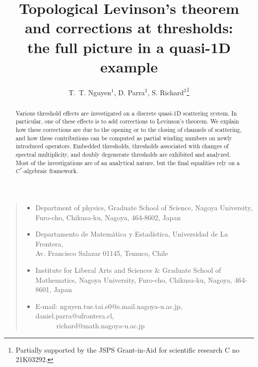 \documentclass[11pt]{article}
\begin{document}

\title{Topological Levinson's theorem and corrections at thresholds: \\
the full picture in a quasi-1D example}

\author{T.~T. Nguyen${}^1$, D. Parra${}^2$, S. Richard${}^3$\footnote{Partially supported by the JSPS Grant-in-Aid for scientific research C no 21K03292.}}

\date{\small}
\maketitle
\vspace{-1cm}

\begin{quote}
\begin{itemize}
\item[1] Department of physics, Graduate School of Science, Nagoya University, Furo-cho, Chikusa-ku, Nagoya, 464-8602, Japan
\item[2] 
Departamento de Matem\'atica y Estad\'istica, Universidad de La Frontera, \\ Av. Francisco Salazar 01145, Temuco, Chile
\item[3] Institute for Liberal Arts and Sciences \& Graduate School of Mathematics, Nagoya University, Furo-cho, Chikusa-ku, Nagoya, 464-8601, Japan
\item[] E-mail:  nguyen.tue.tai.e0@s.mail.nagoya-u.ac.jp, daniel.parra@ufrontera.cl, \\ 
${}\qquad \quad{}$richard@math.nagoya-u.ac.jp
\end{itemize}
\end{quote}

\date{\small}
\maketitle


\begin{abstract}
Various threshold effects are investigated on
a discrete quasi-1D scattering system. In particular, one of these effects is 
to add corrections to Levinson's theorem.
We explain how these corrections are due to the opening or to the closing 
of channels of scattering, and how these contributions can be computed as partial winding numbers on newly introduced operators.
Embedded thresholds, thresholds associated with changes of spectral multiplicity, 
and doubly degenerate thresholds are exhibited and analyzed.
Most of the investigations are of an analytical nature, but the final equalities rely on 
a $C^*$-algebraic framework.
\end{abstract}
\end{document}
